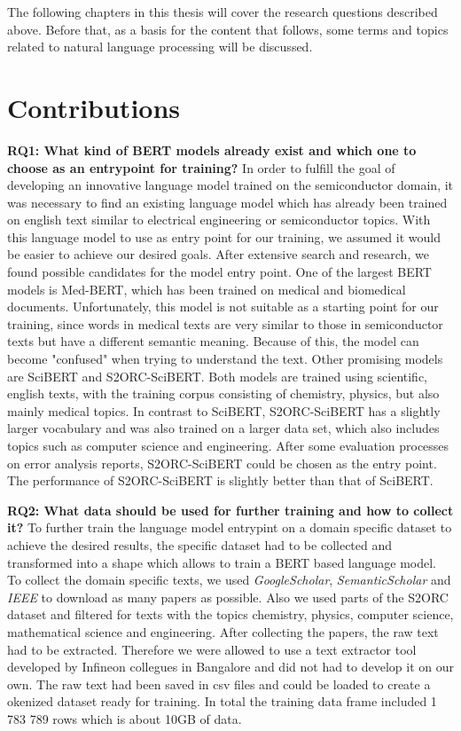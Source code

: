 The following chapters in this thesis will cover the research questions described above. Before that, as a basis for the content that follows, some terms and topics related to natural language processing will be discussed.

\section{Contributions}
\textbf{RQ1: What kind of BERT models already exist and which one to choose as an entrypoint for training?} \newline
In order to fulfill the goal of developing an innovative language model trained on the semiconductor domain, it was necessary to find an existing language model which has already been trained on english text similar to electrical engineering or semiconductor topics. With this language model to use as entry point for our training, we assumed it would be easier to achieve our desired goals. 
After extensive search and research, we found possible candidates for the model entry point. One of the largest BERT models is Med-BERT, which has been trained on medical and biomedical documents. Unfortunately, this model is not suitable as a starting point for our training, since words in medical texts are very similar to those in semiconductor texts but have a different semantic meaning. Because of this, the model can become "confused" when trying to understand the text. Other promising models are SciBERT and S2ORC-SciBERT. Both models are trained using scientific, english texts, with the training corpus consisting of chemistry, physics, but also mainly medical topics. In contrast to SciBERT, S2ORC-SciBERT has a slightly larger vocabulary and was also trained on a larger data set, which also includes topics such as computer science and engineering. \newline
After some evaluation processes on error analysis reports, S2ORC-SciBERT could be chosen as the entry point. The performance of S2ORC-SciBERT is slightly better than that of SciBERT.

\textbf{RQ2: What data should be used for further training and how to collect it?} \newline
To further train the language model entrypint on a domain specific dataset to achieve the desired results, the specific dataset had to be collected and transformed into a shape which allows to train a BERT based language model. To collect the domain specific texts, we used \textit{GoogleScholar}, \textit{SemanticScholar} and \textit{IEEE} to download as many papers as possible. Also we used parts of the S2ORC dataset and filtered for texts with the topics chemistry, physics, computer science, mathematical science and engineering. After collecting the papers, the raw text had to be extracted. Therefore we were allowed to use a text extractor tool developed by Infineon collegues in Bangalore and did not had to develop it on our own. The raw text had been saved in csv files and could be loaded to create a okenized dataset ready for training. In total the training data frame included 1 783 789 rows which is about 10GB of data.



